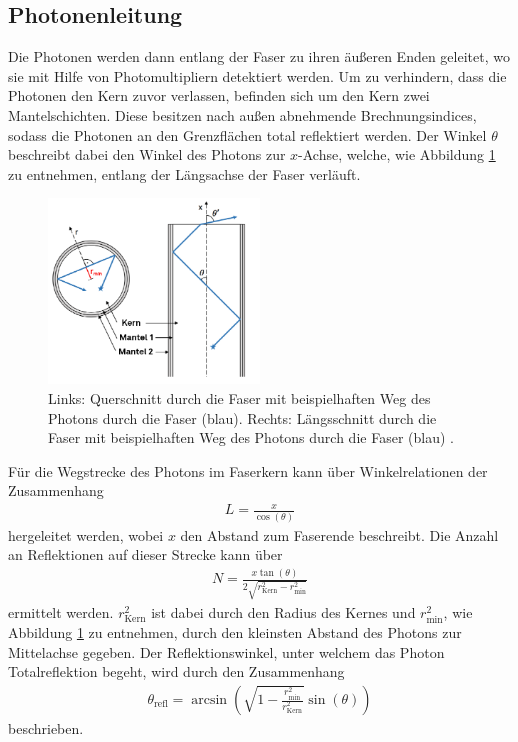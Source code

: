 \subsection{Photonenleitung}
\label{theorie}
Die Photonen werden dann entlang der Faser zu ihren äußeren Enden geleitet, wo sie mit Hilfe von Photomultipliern detektiert werden. Um zu verhindern, dass die Photonen den Kern zuvor verlassen, befinden sich um den Kern zwei Mantelschichten. Diese besitzen nach außen abnehmende Brechnungsindices, sodass die Photonen an den Grenzflächen total reflektiert werden. Der Winkel $\theta$ beschreibt dabei den Winkel des Photons zur $x$-Achse, welche, wie Abbildung \ref{fig:Geometrie} zu entnehmen, entlang der Längsachse der Faser verläuft.
\begin{figure}
    \centering
    \includegraphics[width=0.5\textwidth]{plots/Geometrie.png}
    \caption{Links: Querschnitt durch die Faser mit beispielhaften Weg des Photons durch die Faser (blau). Rechts: Längsschnitt durch die Faser mit beispielhaften Weg des Photons durch die Faser (blau) \cite{anleitung}.}
    \label{fig:Geometrie}
  \end{figure} 
Für die Wegstrecke des Photons im Faserkern kann über Winkelrelationen der Zusammenhang 
\begin{align}
    L = \frac{x}{\cos(\theta)}
    \label{eq:1.1}
\end{align}
hergeleitet werden, wobei $x$ den Abstand zum Faserende beschreibt. Die Anzahl an Reflektionen auf dieser Strecke kann über 
\begin{align}
    N = \frac{x \tan(\theta)}{2 \sqrt{r_\mathrm{Kern}^2 - r_\mathrm{min}^2}}
    \label{eq:1.2}
\end{align}
ermittelt werden. $r_\mathrm{Kern}^2$ ist dabei durch den Radius des Kernes und $r_\mathrm{min}^2$, wie Abbildung \ref{fig:Geometrie} zu entnehmen, durch den kleinsten Abstand des Photons zur Mittelachse gegeben. Der Reflektionswinkel, unter welchem das Photon Totalreflektion begeht, wird durch den Zusammenhang 
\begin{align}
    \theta_\mathrm{refl} = \arcsin\left( \sqrt{1 - \frac{r_\mathrm{min}^2}{r_\mathrm{Kern}^2}} \sin(\theta)\right)
    \label{eq:2}
\end{align}
beschrieben. 

